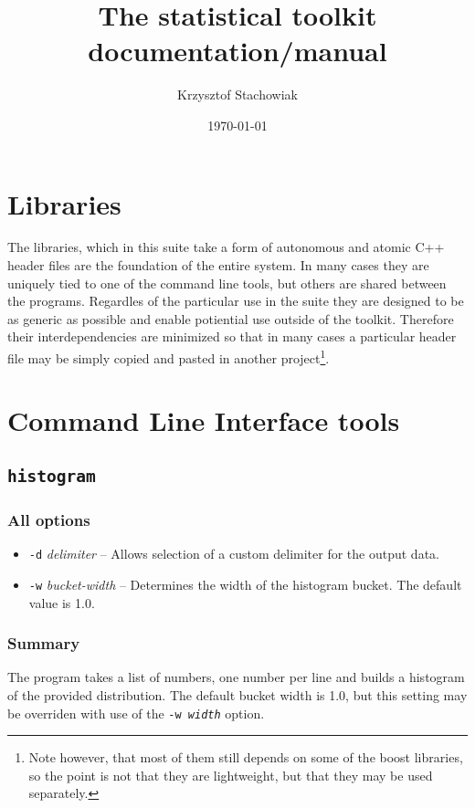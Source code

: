 \documentclass{report}
\begin{document}
\title{The statistical toolkit documentation/manual}
\author{Krzysztof Stachowiak}
\date{\today}

\maketitle

\tableofcontents

\chapter{Libraries}
The libraries, which in this suite take a form of autonomous and atomic C++
header files are the foundation of the entire system. In many cases they are
uniquely tied to one of the command line tools, but others are shared between
the programs. Regardles of the particular use in the suite they are designed to
be as generic as possible and enable potiential use outside of the toolkit.
Therefore their interdependencies are minimized so that in many cases a
particular header file may be simply copied and pasted in another
project\footnote{Note however, that most of them still depends on some of the boost
libraries, so the point is not that they are lightweight, but that they may be
used separately.}.

\chapter{Command Line Interface tools}

\section{\texttt{histogram}}

\subsection{All options}
\begin{itemize}
	\item \texttt{-d} \textit{delimiter} -- Allows selection of a custom
		delimiter for the output data.
	\item \texttt{-w} \textit{bucket-width} -- Determines the width of the
		histogram bucket. The default value is 1.0.
\end{itemize}

\subsection{Summary}
The program takes a list of numbers, one number per line and builds
a histogram of the provided distribution. The default bucket width is 1.0,
but this setting may be overriden with use of the \texttt{-w \textit{width}}
option.
\end{document}
